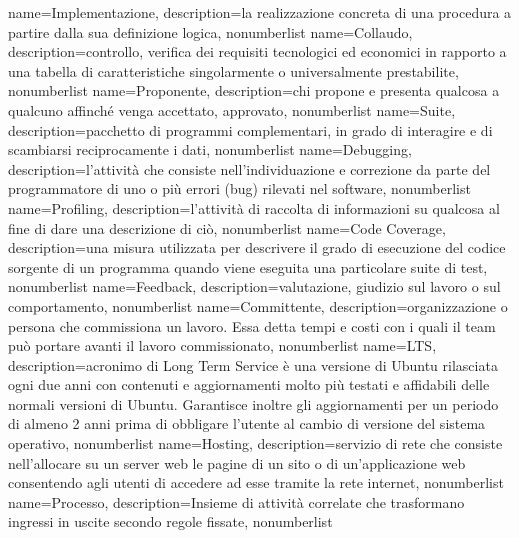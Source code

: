 
\usepackage{glossaries}
\usepackage[utf8x]{inputenc}
\usepackage[italian]{babel}

\makeglossaries

{
	name={Implementazione},
	description={la realizzazione concreta di una procedura a partire dalla sua definizione logica},
	nonumberlist 
}
{
	name={Collaudo},
	description={controllo, verifica dei requisiti tecnologici ed economici in rapporto a una tabella di caratteristiche singolarmente o universalmente prestabilite},
	nonumberlist 
}
{
	name={Proponente},
	description={chi propone e presenta qualcosa a qualcuno affinché venga accettato, approvato},
	nonumberlist 
}
{
	name={Suite},
	description={pacchetto di programmi complementari, in grado di interagire e di scambiarsi reciprocamente i dati},
	nonumberlist 
}
{
name={Debugging},
description={l'attività che consiste nell'individuazione e correzione da parte del programmatore di uno o più errori (bug) rilevati nel software},
nonumberlist 
}
{
name={Profiling},
description={l'attività di raccolta di informazioni su qualcosa al fine di dare una descrizione di ciò},
nonumberlist 
}
{
name={Code Coverage},
description={una misura utilizzata per descrivere il grado di esecuzione del codice sorgente di un programma quando viene eseguita una particolare suite di test},
nonumberlist 
}
{
name={Feedback},
description={valutazione, giudizio sul lavoro o sul comportamento},
nonumberlist 
}
{
name={Committente},
description={organizzazione o persona che commissiona un lavoro. Essa detta tempi e costi con i quali il team può portare avanti il lavoro commissionato},
nonumberlist 
}
{
name={LTS},
description={acronimo di Long Term Service è una versione di Ubuntu rilasciata ogni due anni con contenuti e aggiornamenti molto più testati e affidabili delle normali versioni di Ubuntu. Garantisce inoltre gli aggiornamenti per un periodo di almeno 2 anni prima di obbligare l'utente al cambio di versione del sistema operativo},
nonumberlist 
}
{
name={Hosting},
description={servizio di rete che consiste nell'allocare su un server web le pagine di un sito o di un'applicazione web consentendo agli utenti di accedere ad esse tramite la rete internet},
nonumberlist 
}
{
name={Processo},
description={Insieme di attività correlate che trasformano ingressi in uscite secondo regole fissate},
nonumberlist 
}
